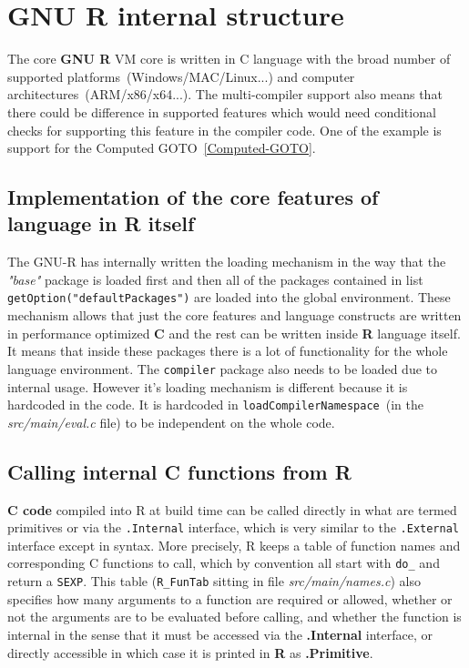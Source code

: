 \documentclass[thesis=M,english]{FITthesis}[2018/10/20]
\newcommand{\code}[1]{\texttt{#1}}
\begin{document}
\section{GNU R internal structure}\label{R-internal-structure}

The core \textbf{GNU R} VM core is written in C language with the broad number of supported platforms~(Windows/MAC/Linux...) and computer architectures~(ARM/x86/x64...). The multi-compiler support also means that there could be difference in supported features which would need conditional checks for supporting this feature in the compiler code. One of the example is support for the Computed GOTO~\ref{Computed-GOTO}.

\subsection{Implementation of the core features of language in R itself}

The GNU-R has internally written the loading mechanism in the way that the \textit{"base"} package is loaded first and then all of the packages contained in list \code{getOption("defaultPackages")} are loaded into the global environment. These mechanism allows that just the core features and language constructs are written in performance optimized \textbf{C} and the rest can be written inside \textbf{R} language itself. It means that inside these packages there is a lot of functionality for the whole language environment. The \code{compiler} package also needs to be loaded due to internal usage. However it's loading mechanism is different because it is hardcoded in the code. It is hardcoded in \code{loadCompilerNamespace}~(in the \textit{src/main/eval.c} file) to be independent on the whole code.


\subsection{Calling internal C functions from R}


\textbf{C code} compiled into R at build time can be called directly in what are termed primitives or via the \code{.Internal} interface, which is very similar to the \code{.External} interface except in syntax. More precisely, R keeps a table of function names and corresponding C functions to call, which by convention all start with \code{do{\_}} and return a \code{SEXP}. This table (\code{R{\_}FunTab} sitting in file \textit{src/main/names.c}) also specifies how many arguments to a function are required or allowed, whether or not the arguments are to be evaluated before calling, and whether the function is internal in the sense that it must be accessed via the \textbf{.Internal} interface, or directly accessible in which case it is printed in \textbf{R} as \textbf{.Primitive}.
\end{document}
